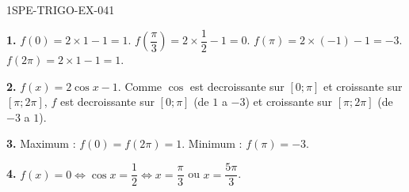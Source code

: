 \begin{corrige}{1SPE-TRIGO-EX-041}

\textbf{1.} $f(0) = 2 \times 1 - 1 = 1$. $f\!\left(\dfrac{\pi}{3}\right) = 2 \times \dfrac{1}{2} - 1 = 0$. $f(\pi) = 2 \times (-1) - 1 = -3$. $f(2\pi) = 2 \times 1 - 1 = 1$.

\textbf{2.} $f(x) = 2\cos x - 1$. Comme $\cos$ est decroissante sur $[0;\pi]$ et croissante sur $[\pi;2\pi]$, $f$ est decroissante sur $[0;\pi]$ (de $1$ a $-3$) et croissante sur $[\pi;2\pi]$ (de $-3$ a $1$).

\textbf{3.} Maximum : $f(0) = f(2\pi) = 1$. Minimum : $f(\pi) = -3$.

\textbf{4.} $f(x) = 0 \iff \cos x = \dfrac{1}{2} \iff x = \dfrac{\pi}{3}$ ou $x = \dfrac{5\pi}{3}$.

\end{corrige}
